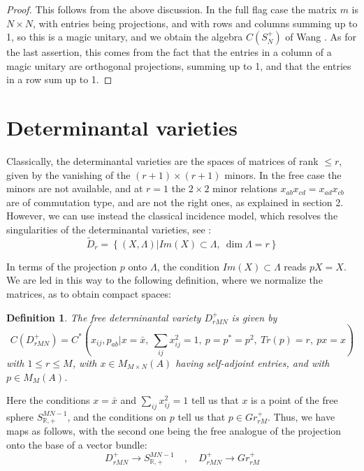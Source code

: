 \documentclass[11pt]{article}
\theoremstyle{plain}
\newtheorem{definition}[theorem]{Definition}
\begin{document}
\begin{proof}
This follows from the above discussion. In the full flag case the matrix $m$ is $N\times N$, with entries being projections, and with rows and columns summing up to 1, so this is a magic unitary, and we obtain the algebra $C(S_N^+)$ of Wang \cite{wa2}. As for the last assertion, this comes from the fact that the entries in a column of a magic unitary are orthogonal projections, summing up to 1, and that the entries in a row sum up to 1.
\end{proof}

\section{Determinantal varieties}

Classically, the determinantal varieties are the spaces of matrices of rank $\leq r$, given by the vanishing of the $(r+1)\times(r+1)$ minors. In the free case the minors are not available, and at $r=1$ the $2\times2$ minor relations $x_{ab}x_{cd}=x_{ad}x_{cb}$ are of commutation type, and are not the right ones, as explained in section 2. However, we can use instead the classical incidence model, which resolves the singularities of the determinantal varieties, see \cite{har}:
$$\widetilde{D}_r=\left\{(X,\Lambda)\Big|Im(X)\subset\Lambda,\ \dim\Lambda=r\right\}$$

In terms of the projection $p$ onto $\Lambda$, the condition $Im(X)\subset\Lambda$ reads $pX=X$. We are led in this way to the following definition, where we normalize the matrices, as to obtain compact spaces:

\begin{definition}
The free determinantal variety $D^+_{rMN}$ is given by
$$C(D^+_{rMN})=C^*\left(x_{ij},p_{ab}\Big|x=\bar{x},\ \sum_{ij}x_{ij}^2=1,\ p=p^*=p^2,\ Tr(p)=r,\ px=x\right)$$
with $1\leq r\leq M$, with $x\in M_{M\times N}(A)$ having self-adjoint entries, and with $p\in M_M(A)$.
\end{definition}

Here the conditions $x=\bar{x}$ and $\sum_{ij}x_{ij}^2=1$ tell us that $x$ is a point of the free sphere $S^{MN-1}_{\mathbb R,+}$, and the conditions on $p$ tell us that $p\in Gr^+_{rM}$. Thus, we have maps as follows, with the second one being the free analogue of the projection onto the base of a vector bundle:
$$D^+_{rMN}\to S^{MN-1}_{\mathbb R,+}\quad,\quad
D^+_{rMN}\to Gr^+_{rM}$$
\end{document}
